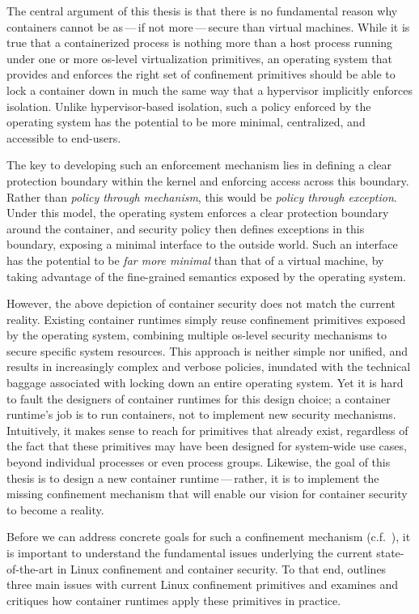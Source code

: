 The central argument of this thesis is that there is no fundamental reason why containers
cannot be as\,---\,if not more\,---\,secure than virtual machines.  While it is true that
a containerized process is nothing more than a host process running under one or more
\gls{os}-level virtualization primitives, an operating system that provides and enforces
the right set of confinement primitives should be able to lock a container down in much
the same way that a hypervisor implicitly enforces isolation.  Unlike hypervisor-based
isolation, such a policy enforced by the operating system has the potential to be more
minimal, centralized, and accessible to end-users.

The key to developing such an enforcement mechanism lies in defining a clear protection
boundary within the kernel and enforcing access across this boundary. Rather than
\textit{policy through mechanism}, this would be \textit{policy through exception}. Under
this model, the operating system enforces a clear protection boundary around the
container, and security policy then defines exceptions in this boundary, exposing
a minimal interface to the outside world.  Such an interface has the potential to be
\textit{far more minimal}  than that of a virtual machine, by taking advantage of the
fine-grained semantics exposed by the operating system.

However, the above depiction of container security does not match the current reality.
Existing container runtimes simply reuse confinement primitives exposed by the operating
system, combining multiple \gls{os}-level security mechanisms to secure specific system
resources.  This approach is neither simple nor unified, and results in increasingly
complex and verbose policies, inundated with the technical baggage associated with locking
down an entire operating system. Yet it is hard to fault the designers of container
runtimes for this design choice; a container runtime's job is to run containers, not to
implement new security mechanisms. Intuitively, it makes sense to reach for primitives
that already exist, regardless of the fact that these primitives may have been designed
for system-wide use cases, beyond individual processes or even process groups. Likewise,
the goal of this thesis is to design a new container runtime\,---\,rather, it is to
implement the missing confinement mechanism that will enable our vision for container
security to become a reality.

Before we can address concrete goals for such a confinement mechanism
(c.f.~), it is important to understand the fundamental
issues underlying the current state-of-the-art in Linux confinement and container
security. To that end,  outlines three main issues with current Linux
confinement primitives and  examines and critiques how container
runtimes apply these primitives in practice.

